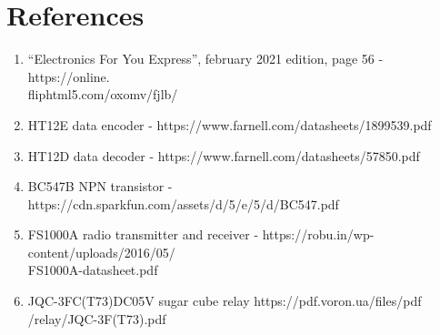 \newpage
{}
\chapter*{References}
\begin{enumerate}
	\item “Electronics For You Express”, february 2021 edition, page 56
		- https://online.\\fliphtml5.com/oxomv/fjlb/
	\item HT12E data encoder - https://www.farnell.com/datasheets/1899539.pdf
	\item HT12D data decoder - https://www.farnell.com/datasheets/57850.pdf
	\item BC547B NPN transistor -
		https://cdn.sparkfun.com/assets/d/5/e/5/d/BC547.pdf
	\item FS1000A radio transmitter and receiver -
		https://robu.in/wp-content/uploads/2016/05/\\FS1000A-datasheet.pdf
	\item JQC-3FC(T73)DC05V sugar cube relay
		https://pdf.voron.ua/files/pdf\\/relay/JQC-3F(T73).pdf
\end{enumerate}
